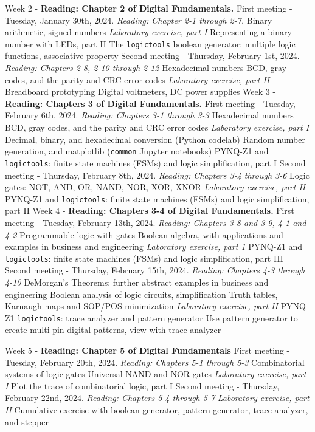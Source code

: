 \documentclass[10pt]{article}
\begin{document}
\begin{outline}[enumerate]
\1 Week 2 - \textbf{Reading: Chapter 2 of Digital Fundamentals.}
\2 First meeting - Tuesday, January 30th, 2024. \textit{Reading: Chapter 2-1 through 2-7.}
\3 Binary arithmetic, signed numbers
\3 \textit{Laboratory exercise, part I}
\4 Representing a binary number with LEDs, part II
\4 The \verb+logictools+ boolean generator: multiple logic functions, associative property
\2 Second meeting - Thursday, February 1st, 2024. \textit{Reading: Chapters 2-8, 2-10 through 2-12}
\3 Hexadecimal numbers
\3 BCD, gray codes, and the parity and CRC error codes
\3 \textit{Laboratory exercise, part II}
\4 Breadboard prototyping
\4 Digital voltmeters, DC power supplies
\1 Week 3 - \textbf{Reading: Chapters 3 of Digital Fundamentals.}
\2 First meeting - Tuesday, February 6th, 2024.  \textit{Reading: Chapters 3-1 through 3-3}
\3 Hexadecimal numbers
\3 BCD, gray codes, and the parity and CRC error codes
\3 \textit{Laboratory exercise, part I}
\4 Decimal, binary, and hexadecimal conversion (Python codelab)
\4 Random number generation, and matplotlib (\verb+common+ Jupyter notebooks)
\4 PYNQ-Z1 and \verb+logictools+: finite state machines (FSMs) and logic simplification, part I
\2 Second meeting - Thursday, February 8th, 2024. \textit{Reading: Chapters 3-4 through 3-6}
\3 Logic gates: NOT, AND, OR, NAND, NOR, XOR, XNOR
\3 \textit{Laboratory exercise, part II}
\4 PYNQ-Z1 and \verb+logictools+: finite state machines (FSMs) and logic simplification, part II
\clearpage
\1 Week 4 - \textbf{Reading: Chapters 3-4 of Digital Fundamentals.}
\2 First meeting - Tuesday, February 13th, 2024. \textit{Reading: Chapters 3-8 and 3-9, 4-1 and 4-2}
\3 Programmable logic with gates
\3 Boolean algebra, with applications and examples in business and engineering
\3 \textit{Laboratory exercise, part 1}
\4 PYNQ-Z1 and \verb+logictools+: finite state machines (FSMs) and logic simplification, part III
\2 Second meeting - Thursday, February 15th, 2024.  \textit{Reading: Chapters 4-3 through 4-10}
\3 DeMorgan's Theorems; further abstract examples in business and engineering
\3 Boolean analysis of logic circuits, simplification
\3 Truth tables, Karnaugh maps and SOP/POS minimization
\3 \textit{Laboratory exercise, part II}
\4 PYNQ-Z1 \verb+logictools+: trace analyzer and pattern generator
\4 Use pattern generator to create multi-pin digital patterns, view with trace analyzer

\1 Week 5 - \textbf{Reading: Chapter 5 of Digital Fundamentals}
\2 First meeting - Tuesday, February 20th, 2024. \textit{Reading:  Chapters 5-1 through 5-3}
\3 Combinatorial systems of logic gates
\3 Universal NAND and NOR gates
\3 \textit{Laboratory exercise, part I}
\4 Plot the trace of combinatorial logic, part I
\2 Second meeting - Thursday, February 22nd, 2024. \textit{Reading: Chapters 5-4 through 5-7}
\3 \textit{Laboratory exercise, part II}
\4 Cumulative exercise with boolean generator, pattern generator, trace analyzer, and stepper


\end{outline}
\end{document}
